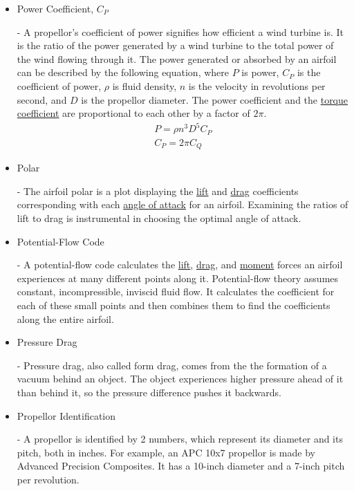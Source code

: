 \documentclass{article}
\begin{document}
\begin{itemize}
	\item \hypertarget{CP}{Power Coefficient, $C_{P}$} - A propellor's coefficient of power signifies how efficient a wind turbine is. It is the ratio of the power generated by a wind turbine to the total power of the wind flowing through it. The power generated or absorbed by an airfoil can be described by the following equation, where $P$ is power, $C_{P}$ is the coefficient of power, $\rho$ is fluid density, $n$ is the velocity in revolutions per second, and $D$ is the propellor diameter. The power coefficient and the \hyperlink{CT}{torque coefficient} are proportional to each other by a factor of $2\pi$.
	\begin{equation}
	\begin{aligned}
		P = \rho n^{3} D^{5} C_{P} \\
		C_{P} = 2 \pi C_{Q}
	\end{aligned}
	\end{equation}

	\item \hypertarget{AP}{Polar} - The airfoil polar is a plot displaying the  \hyperlink{CL}{lift} and  \hyperlink{CD}{drag} coefficients corresponding with each \hyperlink{alpha}{angle of attack} for an airfoil. Examining the ratios of lift to drag is instrumental in choosing the optimal angle of attack.
	
	\item \hypertarget{PFC}{Potential-Flow Code} - A potential-flow code calculates the \hyperlink{CL}{lift}, \hyperlink{CD}{drag}, and \hyperlink{CM}{moment} forces an airfoil experiences at many different points along it. Potential-flow theory assumes constant, incompressible, inviscid fluid flow. It calculates the coefficient for each of these small points and then combines them to find the coefficients along the entire airfoil.
		
	\item \hypertarget{DP}{Pressure Drag} - Pressure drag, also called form drag, comes from the the formation of a vacuum behind an object. The object experiences higher pressure ahead of it than behind it, so the pressure difference pushes it backwards.
	
	\item \hypertarget{APC}{Propellor Identification} - A propellor is identified by 2 numbers, which represent its diameter and its pitch, both in inches. For example, an APC 10x7 propellor is made by Advanced Precision Composites. It has a 10-inch diameter and a 7-inch pitch per revolution.
	

\end{itemize}
\end{document}
